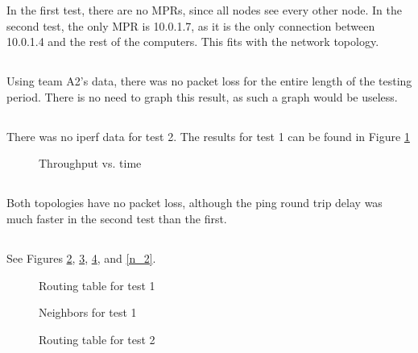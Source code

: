 \documentclass[11pt]{article}
\begin{document}
In the first test, there are no MPRs, since all nodes see every other node. In the second test, the only MPR is 10.0.1.7, as it is the only connection between 10.0.1.4 and the rest of the computers. This fits with the network topology.

\subsection{}

Using team A2's data, there was no packet loss for the entire length of the testing period. There is no need to graph this result, as such a graph would be useless.

\subsection{}

There was no iperf data for test 2. The results for test 1 can be found in Figure \ref{throughput_graph}

\begin{figure}[hp]
	\caption{Throughput vs. time}
	\label{throughput_graph}
\end{figure}

\subsection{}

Both topologies have no packet loss, although the ping round trip delay was much faster in the second test than the first.

\subsection{}

See Figures \ref{rt_1}, \ref{n_1}, \ref{rt_2}, and \ref{n_2}.

\begin{figure}[hp]
	\caption{Routing table for test 1}
	\label{rt_1}
\end{figure}

\begin{figure}[hp]
	\caption{Neighbors for test 1}
	\label{n_1}
\end{figure}

\begin{figure}[hp]
	\caption{Routing table for test 2}
	\label{rt_2}
\end{figure}
\end{document}
